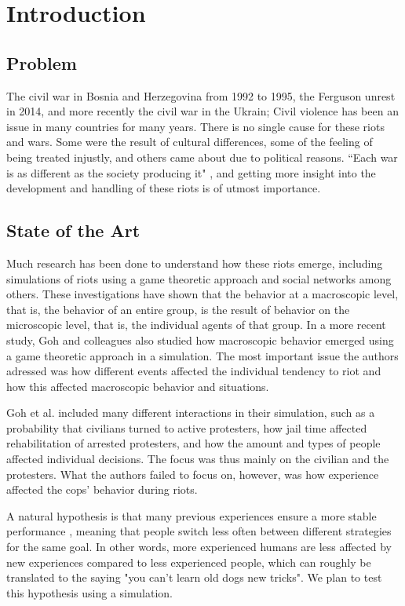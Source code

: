 \section{Introduction}
\subsection{Problem}
The civil war in Bosnia and Herzegovina from 1992 to 1995, the Ferguson unrest in 2014, and more recently the civil war in the Ukrain; Civil violence has been an issue in many countries for many years.
There is no single cause for these riots and wars.
Some were the result of cultural differences, some of the feeling of being treated injustly, and others came about due to political reasons.
``Each war is as different as the society producing it" \citep*{sambanis2001ethnic}, and getting more insight into the development and handling of these riots is of utmost importance.


\subsection{State of the Art}
Much research has been done to understand how these riots emerge, including simulations of riots using a game theoretic approach \citep*{myerson1991game} and social networks \citep*{gulden2002spatial} among others.
These investigations have shown that the behavior at a macroscopic level, that is, the behavior of an entire group, is the result of behavior on the microscopic level, that is, the individual agents of that group.
In a more recent study, Goh and colleagues \citep*{goh2006modeling} also studied how macroscopic behavior emerged using a game theoretic approach in a simulation.
The most important issue the authors adressed was how different events affected the individual tendency to riot and how this affected macroscopic behavior and situations.


Goh et al.
included many different interactions in their simulation, such as a probability that civilians turned to active protesters, how jail time affected rehabilitation of arrested protesters, and how the amount and types of people affected individual decisions.
The focus was thus mainly on the civilian and the protesters.
What the authors failed to focus on, however, was how experience affected the cops' behavior during riots.

A natural hypothesis is that many previous experiences ensure a more stable performance \citep{anderson2007mind,nason2005soar}, 
meaning that people switch less often between different strategies for the same goal.
In other words, more experienced humans are less affected by new experiences compared to less experienced people, which can roughly be translated to the saying "you can't learn old dogs new tricks". 
We plan to test this hypothesis using a simulation.


